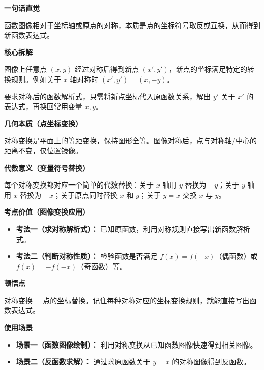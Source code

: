 \clearpage
\begin{explanationbox}
	\textbf{\textcolor{CExplanation}{一句话直觉}}

	函数图像相对于坐标轴或原点的对称，本质是点的坐标符号取反或互换，从而得到新函数表达式。

	\medskip
	\textbf{\textcolor{CExplanation}{核心拆解}}
	\begin{description}[style=nextline, leftmargin=2.8em, labelsep=0.5em, itemsep=0.45em]
		\item[\textbf{要点一（坐标对应变换）：}] 图像上任意点 $(x, y)$ 经过对称后得到新点 $(x', y')$，新点的坐标满足特定的转换规则。例如关于 $x$ 轴对称时 $(x',y')=(x,-y)$。
		\item[\textbf{要点二（解析式替换）：}] 要求对称后的函数解析式，只需将新点坐标代入原函数关系，解出 $y'$ 关于 $x'$ 的表达式，再换回常用变量 $x,y$。
	\end{description}

	\medskip
	\textbf{\textcolor{CExplanation}{几何本质（点坐标变换）}}

	对称变换是平面上的等距变换，保持图形全等。图像对称后，点与对称轴/中心的距离不变，仅位置镜像。

	\medskip
	\textbf{\textcolor{CExplanation}{代数意义（变量符号替换）}}

	每个对称变换都对应一个简单的代数替换：关于 $x$ 轴用 $y$ 替换为 $-y$；关于 $y$ 轴用 $x$ 替换为 $-x$；关于原点同时替换 $x$ 和 $y$；关于 $y=x$ 交换 $x$ 与 $y$。

	\medskip
	\textbf{\textcolor{CExplanation}{考点价值（图像变换应用）}}
	\begin{itemize}[leftmargin=*, itemsep=0.5em, topsep=0.4em]
		\item \textbf{考法一（求对称解析式）：} 已知原函数，利用对称规则直接写出新函数解析式。
		\item \textbf{考法二（判断对称性质）：} 检验函数是否满足 $f(x)=f(-x)$（偶函数）或 $f(x)=-f(-x)$（奇函数）等。
	\end{itemize}

	\medskip
	\textbf{\textcolor{CExplanation}{顿悟点}}

	对称变换 = 点的坐标替换。记住每种对称对应的坐标变换规则，就能直接写出函数表达式。

	\medskip
	\textbf{\textcolor{CExplanation}{使用场景}}
	\begin{itemize}[leftmargin=*, itemsep=0.5em, topsep=0.4em]
		\item \textbf{场景一（函数图像绘制）：} 利用对称变换从已知函数图像快速得到相关图像。
		\item \textbf{场景二（反函数求解）：} 通过求原函数关于 $y=x$ 的对称图像得到反函数。
	\end{itemize}
\end{explanationbox}
